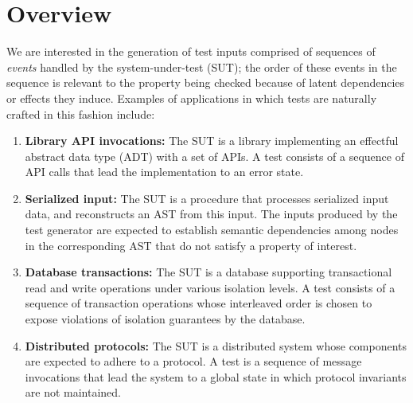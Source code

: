 \section{Overview}
\label{sec:overview}

We are interested in the generation of test inputs comprised of
sequences of \emph{events} handled by the system-under-test (SUT); the
order of these events in the sequence is relevant to the property
being checked because of latent dependencies or effects they induce.
Examples of applications in which tests are naturally crafted in this
fashion include:
\begin{enumerate}

\item \textbf{Library API invocations:} The SUT is a library
  implementing an effectful abstract data type (ADT) with a set of
  APIs.  A test consists of a sequence of API calls that lead the
  implementation to an error state.

\item \textbf{Serialized input:} The SUT is a procedure that processes
  serialized input data, and reconstructs an AST from this input.  The
  inputs produced by the test generator are expected to establish
  semantic dependencies among nodes in the corresponding AST that do
  not satisfy a property of interest.

\item \textbf{Database transactions:} The SUT is a database supporting
  transactional read and write operations under various isolation
  levels.  A test consists of a sequence of transaction operations
  whose interleaved order is chosen to expose violations of isolation
  guarantees by the database.

\item \textbf{Distributed protocols:} The SUT is a distributed system
  whose components are expected to adhere to a protocol.  A test is a
  sequence of message invocations that lead the system to a global
  state in which protocol invariants are not maintained.
\end{enumerate}



